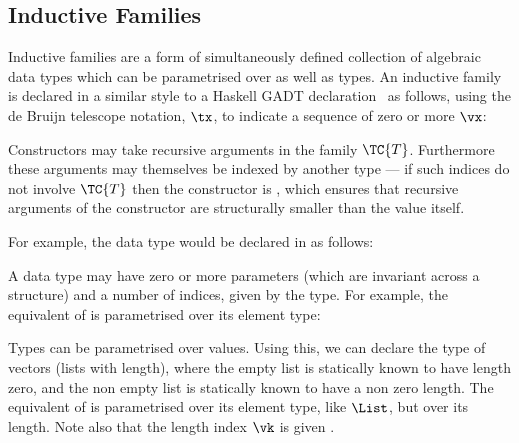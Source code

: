 \subsection{Inductive Families}

\label{sect:inductivefams}

Inductive families \cite{dybjer1994inductive} are a form of simultaneously
defined collection of algebraic data types which can be parametrised over
 as well as types.  An inductive family is declared 
in a similar style to a Haskell GADT declaration~\cite{pj2006gadts}
as
follows, using the de Bruijn telescope notation, $\tx$, to indicate a
sequence of zero or more $\vx$:


Constructors may take recursive arguments in the family
$\TC{T}$. Furthermore these arguments may themselves be indexed by another type ---
if such indices do not involve $\TC{T}$ then the constructor is
, which ensures that recursive arguments of the
constructor are structurally smaller than the value itself.

For example, the \Idris{} data type  would be declared in \TT{} as follows:

\DM{
\Data\hg\Nat\Hab\Type\hg\Where\hg\Z\Hab\Nat\:\mid\:\suc\Hab\fbind{\vk}{\Nat}{\Nat}
}

A data type may have zero or more parameters (which are invariant
across a structure) and a number of indices, given by the type. For
example, the \TT{} equivalent of  is parametrised over its element type:

\DM{
\AR{
\Data\hg\List\:(\va\Hab\Type)\Hab\Type\hg\Where
\ARd{
& \nil\Hab\List\:\va\\
\mid & (\cons)\Hab\fbind{\vx}{\va}{\fbind{\vxs}{\List\:\va}{\List\:\va}}
}
}
}

Types can be
parametrised over values. Using this, we can declare the type of
vectors (lists with length), where the empty list is statically known
to have length zero, and the non empty list is statically known to
have a non zero length. The \TT{} equivalent of  is parametrised over its element type,
like $\List$, but  over its length. Note also that the length
index $\vk$ is given .

\DM{
\AR{
\Data\hg\Vect\:(\va\Hab\Type)\Hab\Nat\to\Type\hg\Where \\
\hg\hg\ARd{
& \nil\Hab\Vect\:\va\:\Z\\
\mid & (\cons)\Hab\fbind{\vk}{\Nat}{
\fbind{\vx}{\va}{\fbind{\vxs}{\Vect\:\va\:\vk}{\Vect\:\va\:(\suc\:\vk)}}
}
}
}
}

